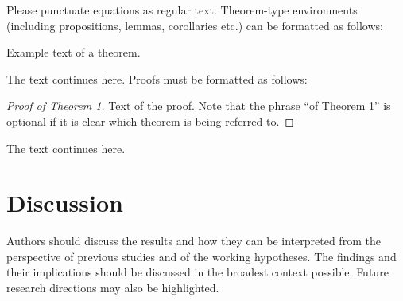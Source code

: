 \documentclass[journal,article,submit,pdftex,moreauthors]{Definitions/mdpi}
\begin{document}
\begin{itemize}


Please punctuate equations as regular text. Theorem-type environments (including propositions, lemmas, corollaries etc.) can be formatted as follows:
\begin{Theorem}
Example text of a theorem.
\end{Theorem}

The text continues here. Proofs must be formatted as follows:

\begin{proof}[Proof of Theorem 1]
Text of the proof. Note that the phrase ``of Theorem 1'' is optional if it is clear which theorem is being referred to.
\end{proof}
The text continues here.

\section{Discussion}

Authors should discuss the results and how they can be interpreted from the perspective of previous studies and of the working hypotheses. The findings and their implications should be discussed in the broadest context possible. Future research directions may also be highlighted.


\end{itemize}
\end{document}
